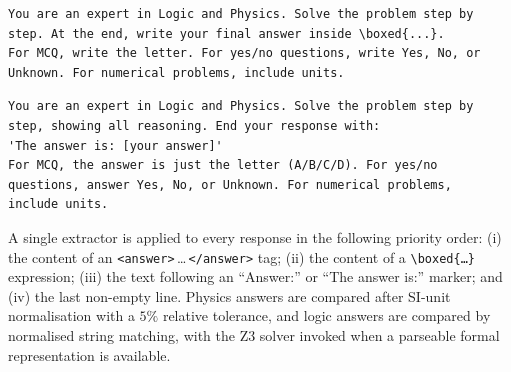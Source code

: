 \documentclass[APA,twocolumn]{USG}
\begin{document}
\begin{lstlisting}[caption={Boxed chain-of-thought prompt.},captionpos=b]
You are an expert in Logic and Physics. Solve the problem step by
step. At the end, write your final answer inside \boxed{...}.
For MCQ, write the letter. For yes/no questions, write Yes, No, or
Unknown. For numerical problems, include units.
\end{lstlisting}

\begin{lstlisting}[caption={Plain chain-of-thought prompt.},captionpos=b]
You are an expert in Logic and Physics. Solve the problem step by
step, showing all reasoning. End your response with:
'The answer is: [your answer]'
For MCQ, the answer is just the letter (A/B/C/D). For yes/no
questions, answer Yes, No, or Unknown. For numerical problems,
include units.
\end{lstlisting}

A single extractor is applied to every response in the following priority
order: (i) the content of an \texttt{<answer>}\,\ldots\,\texttt{</answer>}
tag; (ii) the content of a \texttt{\textbackslash boxed\{\ldots\}} expression;
(iii) the text following an ``Answer:'' or ``The answer is:'' marker; and
(iv) the last non-empty line. Physics answers are compared after SI-unit
normalisation with a $5\%$ relative tolerance, and logic answers are compared by
normalised string matching, with the Z3 solver invoked when a parseable formal
representation is available.
\end{document}

